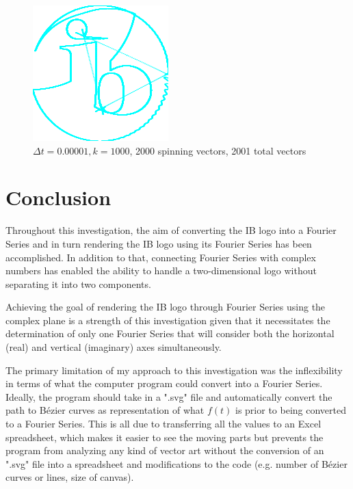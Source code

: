 \documentclass[letterpaper, 12pt]{article}
\begin{document}
\begin{paracol}{3}
    \begin{figure}[H]
        \centering
        \includegraphics[width=\linewidth]{1000.png}
        \caption{\protect\(\Delta t = 0.00001, k = 1000\), 2000 spinning vectors, 2001 total vectors}
        \label{fig:strongestRender}
    \end{figure}
\end{paracol}

\section{Conclusion}

Throughout this investigation, the aim of converting
the IB logo into a Fourier Series and in turn
rendering the IB logo using its Fourier Series has been
accomplished. In addition to that, connecting
Fourier Series with complex numbers has enabled
the ability to handle a two-dimensional
logo without separating it into two components.

Achieving the goal of rendering the IB logo through
Fourier Series using the complex plane is a strength
of this investigation given that it necessitates
the determination of only one Fourier Series
that will consider both the horizontal (real)
and vertical (imaginary) axes simultaneously.

The primary limitation of my approach to this investigation
was the inflexibility in terms of what the
computer program could convert into a Fourier Series.
Ideally, the program should take in a ".svg" file and
automatically convert the path to Bézier curves
as representation of what \(f(t)\) is
prior to being converted to a Fourier Series.
This is all due to transferring all the values
to an Excel spreadsheet, which makes it easier to
see the moving parts but prevents the program
from analyzing any kind of vector art
without the conversion of an ".svg" file into
a spreadsheet and modifications to the code
(e.g. number of Bézier curves or lines, size of canvas).
\end{document}
